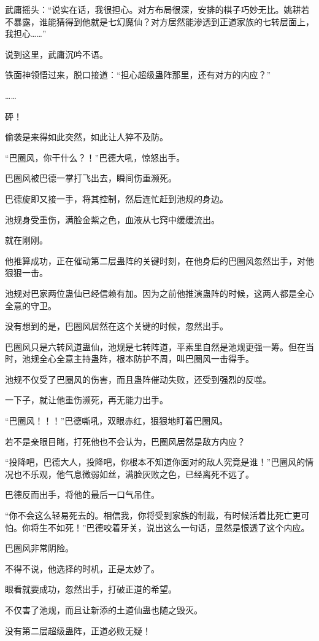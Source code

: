\begin{this_body}
武庸摇头：“说实在话，我很担心。对方布局很深，安排的棋子巧妙无比。姚耕若不暴露，谁能猜得到他就是七幻魔仙？对方居然能渗透到正道家族的七转层面上，我担心……”

说到这里，武庸沉吟不语。

铁面神领悟过来，脱口接道：“担心超级蛊阵那里，还有对方的内应？”

……

砰！

偷袭是来得如此突然，如此让人猝不及防。

“巴圈风，你干什么？！”巴德大吼，惊怒出手。

巴圈风被巴德一掌打飞出去，瞬间伤重濒死。

巴德旋即又接一手，将其控制，然后连忙赶到池规的身边。

池规身受重伤，满脸金紫之色，血液从七窍中缓缓流出。

就在刚刚。

他推算成功，正在催动第二层蛊阵的关键时刻，在他身后的巴圈风忽然出手，对他狠狠一击。

池规对巴家两位蛊仙已经信赖有加。因为之前他推演蛊阵的时候，这两人都是全心全意的守卫。

没有想到的是，巴圈风居然在这个关键的时候，忽然出手。

巴圈风只是六转风道蛊仙，池规是七转阵道，平素里自然是池规更强一筹。但在当时，池规全心全意主持蛊阵，根本防护不周，叫巴圈风一击得手。

池规不仅受了巴圈风的伤害，而且蛊阵催动失败，还受到强烈的反噬。

一下子，就让他重伤濒死，再无能力出手。

“巴圈风！！！”巴德嘶吼，双眼赤红，狠狠地盯着巴圈风。

若不是亲眼目睹，打死他也不会认为，巴圈风居然是敌方内应？

“投降吧，巴德大人，投降吧，你根本不知道你面对的敌人究竟是谁！”巴圈风的情况也不乐观，他气息微弱如丝，满脸灰败之色，已经离死不远了。

巴德反而出手，将他的最后一口气吊住。

“你不会这么轻易死去的。相信我，你将受到家族的制裁，有时候活着比死亡更可怕。你将生不如死！”巴德咬着牙关，说出这么一句话，显然是恨透了这个内应。

巴圈风非常阴险。

不得不说，他选择的时机，正是太妙了。

眼看就要成功，忽然出手，打破正道的希望。

不仅害了池规，而且让新添的土道仙蛊也随之毁灭。

没有第二层超级蛊阵，正道必败无疑！

\end{this_body}

